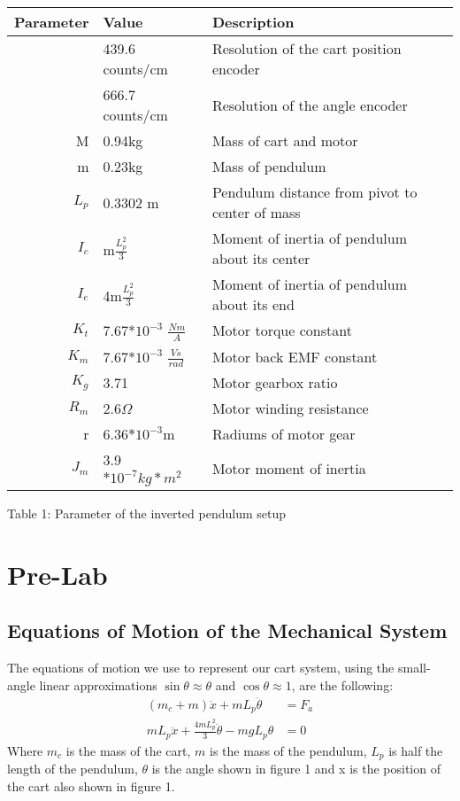 \documentclass[11pt, twoside, letterpaper]{article}   	%
\begin{document}
\begin{tabular}{|r|l|l|}
\hline
Parameter & Value & Description\\
\hline
&439.6 counts/cm &Resolution of the cart position encoder\\
\hline
&666.7 counts/cm &Resolution of the angle encoder\\
\hline
M&0.94kg &Mass of cart and motor\\
\hline
m&0.23kg &Mass of pendulum\\
\hline
$L_p$&0.3302 m&Pendulum distance from pivot to center of mass\\
\hline
$I_c$&m$\frac{L_p^2}{3}$&Moment of inertia of pendulum about its center\\
\hline
$I_e$&4m$\frac{L_p^2}{3}$&Moment of inertia of pendulum about its end\\
\hline
$K_t$&7.67*$10^{-3}$ $\frac{Nm}{A}$&Motor torque constant\\
\hline
$K_m$&7.67*$10^{-3}$ $\frac{Vs}{rad}$&Motor back EMF constant\\
\hline
$K_g$&3.71 &Motor gearbox ratio\\
\hline
$R_m$&2.6$\Omega$&Motor winding resistance\\
\hline
r& 6.36$*10^{-3}$m& Radiums of motor gear\\
\hline
$J_m$& 3.9$*10^{-7}kg*m^2$& Motor moment of inertia\\
\hline
\end{tabular}
\begin{center}
Table 1: Parameter of the inverted pendulum setup
\end{center}

\section{Pre-Lab}
\subsection{Equations of Motion of the Mechanical System}
The equations of motion we use to represent our cart system, using the small-angle linear
approximations $\sin{\theta}\approx \theta$ and $\cos{\theta}\approx 1$, are the following:
\begin{align}
(m_c+m)\ddot{x}+mL_p\ddot{\theta}&=F_a\\
mL_p\ddot{x}+\frac{4mL_p^2}{3}\ddot{\theta}-mgL_p\theta &= 0
\end{align}
Where $m_c$ is the mass of the cart, $m$ is the mass of the pendulum,
$L_p$ is half the length of the pendulum, $\theta$ is the angle shown in
figure 1 and x is the position of the cart also shown in figure 1.
\end{document}
